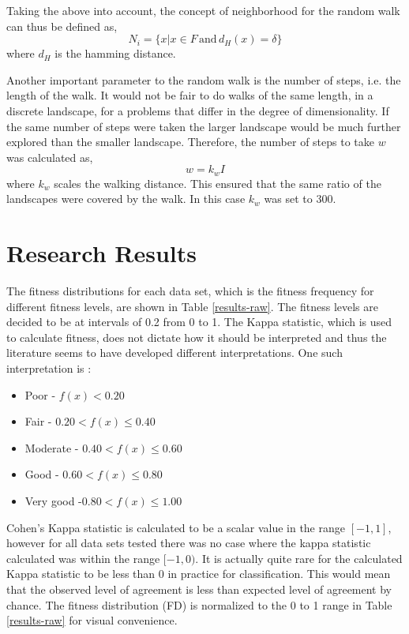 \documentclass[journal,comsoc]{IEEEtran}
\begin{document}
Taking the above into account, the concept of neighborhood for the random walk can thus be defined as,
$$
	N_i = \{ x | x \in F \, \text{and} \, d_H(x) = \delta \}
$$
where $d_H$ is the hamming distance. 

Another important parameter to the random walk is the number of steps, i.e. the length of the walk. It would not be fair to do walks of the same length, in a discrete landscape, for a problems that differ in the degree of dimensionality. If the same number of steps were taken the larger landscape would be much further explored than the smaller landscape. Therefore, the number of steps to take $w$ was calculated as,
$$
 w = k_w I
$$
where $k_w$ scales the walking distance. This ensured that the same ratio of the landscapes were covered by the walk. In this case $k_w$ was set to 300.

\section{Research Results}

The fitness distributions for each data set, which is the fitness frequency for different fitness levels, are shown in Table \ref{results-raw}. The fitness levels are  decided to be at intervals of 0.2 from 0 to 1. The Kappa statistic, which is used to calculate fitness, does not dictate how it should be interpreted and thus the literature seems to have developed different interpretations. One such interpretation is \cite{altman1990practical}:

\begin{itemize}
\item
Poor - $f(x) < 0.20$
\item
Fair - $0.20 < f(x) \leq 0.40$
\item
Moderate - $0.40 < f(x) \leq 0.60$
\item Good - $0.60 < f(x) \leq 0.80$
\item Very good  -$ 0.80 < f(x) \leq 1.00$
\end{itemize}

Cohen's Kappa statistic is calculated to be a scalar value in the range $[-1,1]$, however for all data sets tested there was no case where the kappa statistic calculated was within the range $[-1,0)$. It is actually quite rare for the calculated Kappa statistic to be less than 0 in practice for classification. This would mean that the observed level of agreement is less than expected level of agreement by chance. The fitness distribution (FD) is normalized to the 0 to 1 range in Table \ref{results-raw} for visual convenience. 
\end{document}
